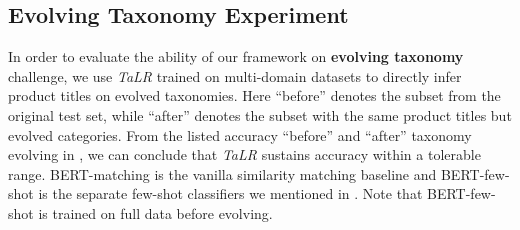 \subsection{Evolving Taxonomy Experiment}
\label{sec:evolve res}
In order to evaluate the ability of our framework on \textbf{evolving taxonomy} challenge, 
we use \textit{TaLR} trained on multi-domain datasets to directly infer product titles on evolved taxonomies.
Here ``before'' denotes the subset from the original test set, while ``after'' denotes the subset with the same product titles but evolved categories.
From the listed accuracy ``before'' and ``after'' taxonomy evolving in , we can conclude that \textit{TaLR} sustains accuracy within a tolerable range.
BERT-matching is the vanilla similarity matching baseline and BERT-few-shot is the separate few-shot classifiers we mentioned in . Note that BERT-few-shot is trained on full data before evolving.


